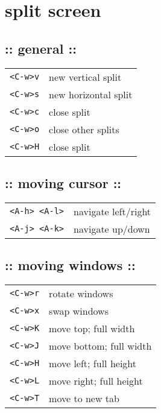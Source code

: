 \section{\hrulefill split screen\hrulefill}

\subsection{:: general ::}
\begin{tabular}{@{}ll@{}}
    \verb!<C-w>v!           & new vertical split \\
    \verb!<C-w>s!           & new horizontal split \\
    \verb!<C-w>c!           & close split \\
    \verb!<C-w>o!           & close other splits \\
    \verb!<C-w>H!           & close split \\
\end{tabular}

\subsection{:: moving cursor ::}
\begin{tabular}{@{}ll@{}}
    \verb!<A-h> <A-l>!      & navigate left/right \\
    \verb!<A-j> <A-k>!      & navigate up/down \\
\end{tabular}

\subsection{:: moving windows ::}
\begin{tabular}{@{}ll@{}}
    \verb!<C-w>r!           & rotate windows \\
    \verb!<C-w>x!           & swap windows \\
    \verb!<C-w>K!           & move top; full width \\
    \verb!<C-w>J!           & move bottom; full width \\
    \verb!<C-w>H!           & move left; full height \\
    \verb!<C-w>L!           & move right; full height \\
    \verb!<C-w>T!           & move to new tab \\
\end{tabular}

